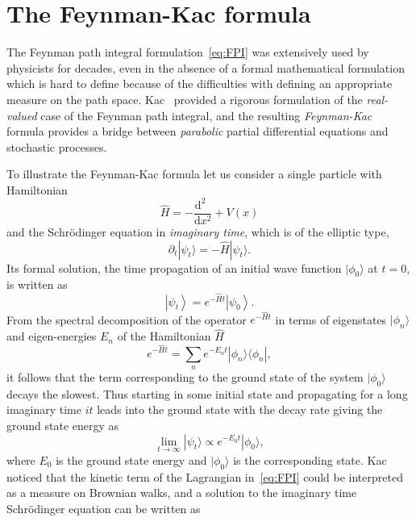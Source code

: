 \section{The Feynman-Kac formula}
\label{subsec:fk-fk}
The Feynman path integral formulation~\eqref{eq:FPI} was extensively used by physicists for decades, even in the absence of a formal mathematical formulation which is hard to define because of the difficulties with defining an appropriate measure on the path space. Kac~\cite{kac1949distributions} provided a rigorous formulation of the \textit{real-valued} case of the Feynman path integral, and the resulting \emph{Feynman-Kac} formula provides a bridge between \emph{parabolic} partial differential equations and stochastic processes.

To illustrate the Feynman-Kac formula let us consider a single particle with Hamiltonian
\begin{equation}
	\hat{H} = -\frac{\mathrm{d}^2~~}{\mathrm{d}x^2} + V(x)
\end{equation}
and the Schr\" odinger equation in \textit{imaginary time}, which is of the elliptic type, 
\begin{equation}
	\label{eq:imag_sch}
	\partial_t | \psi_t \rangle = - \hat{H} | \psi_t \rangle.
\end{equation}
Its formal solution, the time propagation of an initial wave function $|\phi_0\rangle$ at $t=0$, is written as
\begin{equation}
	\left| \psi_{t} \right\rangle = e^{-\hat{H} t}\left|\psi_{0}\right\rangle. 
\end{equation}
From the spectral decomposition of the operator $e^{-\hat{H} t}$ in terms of eigenstates $|\phi_n\rangle$ and eigen-energies $E_n$ of the Hamiltonian $\hat{H}$
\begin{equation}
	e^{-\hat{H} t}=\sum_{n} e^{-E_{n} t}|\phi_n\rangle\langle\phi_n|, 
\end{equation}
it follows that the term corresponding to the ground state of the system $|\phi_0\rangle$ decays the slowest. Thus starting in some initial state and propagating for a long imaginary time $it$ leads into the ground state with the decay rate giving the ground state energy as
\begin{equation}
	\lim_{t \rightarrow \infty} | \psi_t \rangle \propto e^{-E_0 t} | \phi_0 \rangle,
\end{equation} 
where $E_0$ is the ground state energy and $|\phi_0\rangle$ is the corresponding state. Kac noticed that the kinetic term of the Lagrangian in~\eqref{eq:FPI} could be interpreted as a measure on Brownian walks, and a solution to the imaginary time Schr\" odinger equation can be written as
